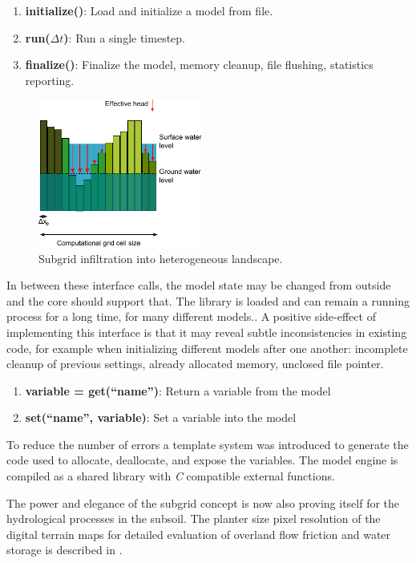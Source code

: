 \documentclass[a4paper]{article}
\begin{document}
\begin{enumerate}
\item \textbf{initialize()}: Load and initialize a model from file.
\item \textbf{run($\Delta t$)}: Run a single timestep.
\item \textbf{finalize()}: Finalize the model, memory cleanup, file flushing, statistics reporting.
\end{enumerate}

\begin{figure}
\centering
\includegraphics[width=0.48\textwidth]{subgrid_hydrology}
\caption{Subgrid infiltration into heterogeneous landscape.}
\label{fig:figure2}
\end{figure}

In between these interface calls, the model state may be changed from outside and the core should support that. The library is loaded and can remain a running process for a long time, for many different models.. A positive side-effect of implementing this interface is that it may reveal subtle inconsistencies in existing code, for example when initializing different models after one another: incomplete cleanup of previous settings, already allocated memory, unclosed file pointer.

\begin{enumerate}
\item \textbf{variable = get(``name'')}: Return a variable from the model
\item \textbf{set(``name'', variable)}: Set a variable into the model
\end{enumerate}

To reduce the number of errors a template system was introduced to generate the code used to allocate,  deallocate, and expose the variables. The model engine is compiled as a shared library with \emph{C} compatible external functions.

The power and elegance of the subgrid concept is now also proving itself for the hydrological processes in the subsoil. The planter size pixel resolution of the digital terrain maps for detailed evaluation of overland flow friction and water storage is described in \citet{Stelling2012}.
\end{document}
